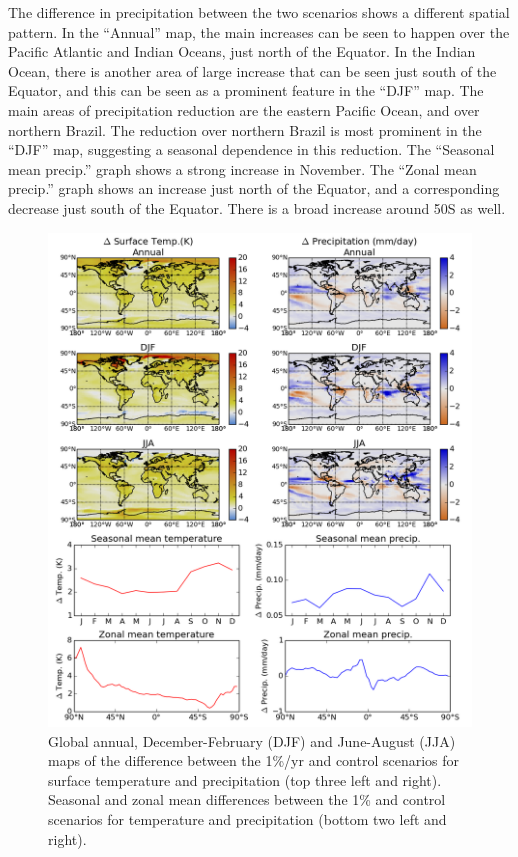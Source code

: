 \documentclass{article}
\begin{document}
The difference in precipitation between the two scenarios shows a different spatial pattern. In the ``Annual'' map, the main increases can be seen to happen over the Pacific Atlantic and Indian Oceans, just north of the Equator. In the Indian Ocean, there is another area of large increase that can be seen just south of the Equator, and this can be seen as a prominent feature in the ``DJF'' map. The main areas of precipitation reduction are the eastern Pacific Ocean, and over northern Brazil. The reduction over northern Brazil is most prominent in the ``DJF'' map, suggesting a seasonal dependence in this reduction. The ``Seasonal mean precip.'' graph shows a strong increase in November. The ``Zonal mean precip.'' graph shows an increase just north of the Equator, and a corresponding decrease just south of the Equator. There is a broad increase around 50\textdegree S as well.



\begin{figure}[hbp]
    \centering
    \includegraphics[width=\textwidth]{figures/global_temp_precip}
    \caption{Global annual, December-February (DJF) and June-August (JJA) maps of the difference between the 1\%/yr and control scenarios for surface temperature and precipitation (top three left and right). Seasonal and zonal mean differences between the 1\% and control scenarios for temperature and precipitation (bottom two left and right).}
    \label{fig:global_temp_precip}
\end{figure}
\end{document}

